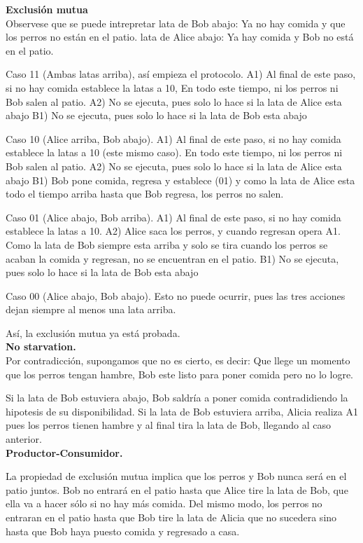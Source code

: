 \documentclass{article}
\begin{document}
\begin{enumerate}
{\bf Exclusión mutua}\\
Observese que se puede intrepretar 
lata de Bob abajo: Ya no hay comida y que los perros no están en el patio.
lata de Alice abajo: Ya hay comida y Bob no está en el patio.

Caso 11 (Ambas latas arriba), así empieza el protocolo.
     A1) Al final de este paso, si no hay comida establece la latas a 10, 
         En todo este tiempo, ni los perros ni Bob salen al patio.
     A2) No se ejecuta, pues solo lo hace si la lata de Alice esta abajo
     B1) No se ejecuta, pues solo lo hace si la lata de Bob esta abajo

Caso 10 (Alice arriba, Bob abajo).
     A1) Al final de este paso, si no hay comida establece la latas a 10 (este mismo caso).
         En todo este tiempo, ni los perros ni Bob salen al patio.
     A2) No se ejecuta, pues solo lo hace si la lata de Alice esta abajo
     B1) Bob pone comida, regresa y establece (01)
         y como la lata de Alice esta todo el tiempo arriba hasta que Bob regresa, los perros no salen.

Caso 01 (Alice abajo, Bob arriba).
     A1) Al final de este paso, si no hay comida establece la latas a 10.
     A2) Alice saca los perros, y cuando regresan opera A1.
         Como la lata de Bob siempre esta arriba y solo se tira cuando los perros se acaban la comida y regresan, no se encuentran en el patio.
     B1) No se ejecuta, pues solo lo hace si la lata de Bob esta abajo
         
Caso 00 (Alice abajo, Bob abajo).
     Esto no puede ocurrir, pues las tres acciones dejan siempre al menos una lata arriba.

Así, la exclusión mutua ya está probada.\\


{\bf No starvation.}\\
Por contradicción, supongamos que no es cierto, es decir:
Que llege un momento que los perros tengan hambre, Bob este listo para poner comida pero no lo logre.

Si la lata de Bob estuviera abajo, Bob saldría a poner comida contradidiendo la hipotesis de su disponibilidad.
Si la lata de Bob estuviera arriba, Alicia realiza A1 pues los perros tienen hambre y al final tira la lata de Bob, llegando al caso anterior.\\

{\bf Productor-Consumidor.}

La propiedad de exclusión mutua implica que los perros y Bob nunca será en el patio juntos. Bob no entrará en el patio hasta que Alice tire la lata de Bob, que ella va a hacer sólo si no hay más comida. 
Del mismo modo, los perros no entraran en el patio hasta que Bob tire la lata de Alicia que no sucedera sino hasta que Bob haya puesto comida y regresado a casa.



\end{enumerate}
\end{document}
